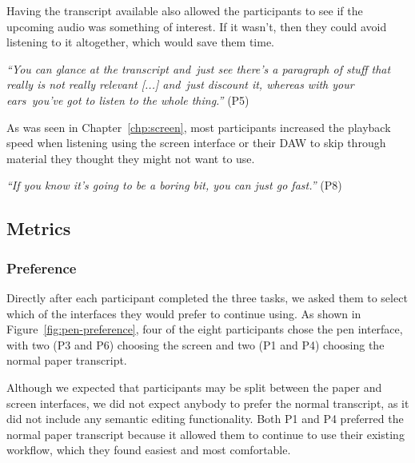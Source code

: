 Having the transcript available also allowed the participants to see if the upcoming audio was something of interest.
If it wasn't, then they could avoid listening to it altogether, which would save them time.

\textit{``You can glance at the transcript and just see there's a paragraph of stuff that really is not really relevant
[...] and just discount it, whereas with your ears you've got to listen to the whole thing.''} (P5) 

As was seen in Chapter~\ref{chp:screen}, most participants increased the playback speed when listening using the screen
interface or their DAW to skip through material they thought they might not want to use.

\textit{``If you know it's going to be a boring bit, you can just go fast.''} (P8)



\subsection{Metrics}

\subsubsection{Preference}\label{sec:pen-preference}

Directly after each participant completed the three tasks, we asked them to select which of the interfaces they would
prefer to continue using. As shown in Figure~\ref{fig:pen-preference}, four of the eight participants chose the pen
interface, with two (P3 and P6) choosing the screen and two (P1 and P4) choosing the normal paper transcript.

Although we expected that participants may be split between the paper and screen interfaces, we did not expect anybody
to prefer the normal transcript, as it did not include any semantic editing functionality.  Both P1 and P4 preferred
the normal paper transcript because it allowed them to continue to use their existing workflow, which they found
easiest and most comfortable.

